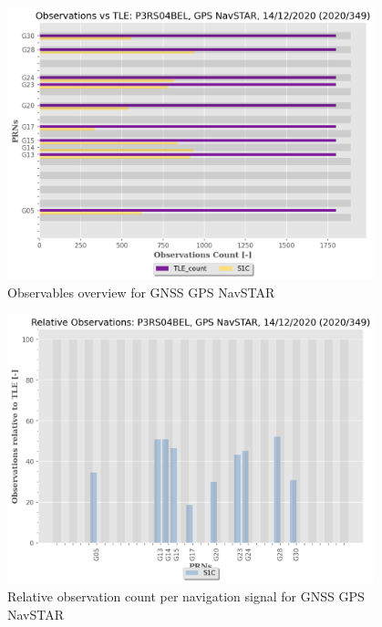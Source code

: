 \begin{figure}[H]%
\centering%
\includegraphics[width=0.95\textwidth]{png/P3RS04BEL_R_20203490000_01D_00U_MO_G-ObsTLE.png}%
\caption{\label{fig:obst_gnss_G} Observables overview for GNSS GPS NavSTAR}%
\end{figure}

%


\begin{figure}[H]%
\centering%
\includegraphics[width=0.95\textwidth]{png/P3RS04BEL_R_20203490000_01D_00U_MO_G-PERC.png}%
\caption{\label{fig:prec_obst_gnss_G} Relative observation count per navigation signal for GNSS GPS NavSTAR}%
\end{figure}

%
\clearpage

